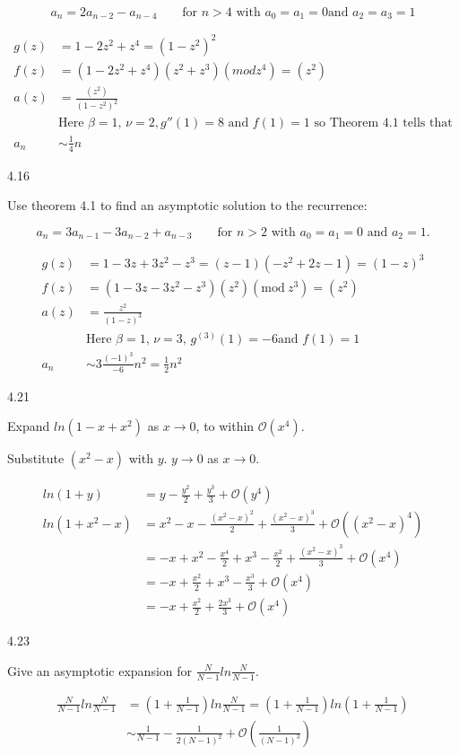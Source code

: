 \documentclass[12pt]{article}
\begin{document}
\[
a_n = 2a_{n - 2} - a_{n - 4} \qquad \text{for $n > 4$ with $a_0 = a_1 = 0$
    and $a_2 = a_3 = 1$}
\]

\[
\begin{split}
g(z) & = 1 - 2z^2 + z^4 = (1 - z^2)^2 \\
f(z) & = (1 - 2z^2 + z^4)(z^2 + z^3)(mod z^4) = (z^2) \\
a(z) & = \frac{(z^2)}{(1 - z^2)^2}\\
& \text{Here $\beta = 1$, $\nu = 2, g''(1) = 8$ and $f(1) = 1$ so Theorem 4.1 tells that} \\
a_n & \sim \frac{1}{4}n
\end{split}
\]

4.16

Use theorem 4.1 to find an asymptotic solution to the recurrence:

\[
a_n = 3a_{n - 1} - 3a_{n - 2} + a_{n - 3} \qquad
\text{for $n > 2$ with $a_0 = a_1 = 0$ and $a_2 = 1$.}
\]

\[
\begin{split}
g(z) & = 1 - 3z + 3z^2 - z^3 = (z - 1)(-z^2 + 2z - 1) = (1 - z)^3 \\
f(z) & = (1 - 3z - 3z^2 - z^3)(z^2)(\text{mod}\ z^3) = (z^2) \\
a(z) & = \frac{z^2}{(1 - z)^3} \\
& \text{Here $\beta = 1$, $\nu = 3$, $g^{(3)}(1) = -6$
    and $f(1) = 1$}\\
a_n & \sim 3\frac{(-1)^3}{-6}n^2 = \frac{1}{2}n^2
\end{split}
\]

4.21

Expand $ln(1 - x + x^2)$ as $x \rightarrow 0$, to within $\mathcal{O}(x^4)$.

Substitute $(x^2 - x)$ with $y$. $y \rightarrow 0$ as $x \rightarrow 0$.

\[
\begin{split}
ln(1 + y) & = y - \frac{y^2}{2} + \frac{y^3}{3} + \mathcal{O}(y^4) \\
ln(1 + x^2 - x) & = x^2 - x - \frac{(x^2 - x)^2}{2} + \frac{(x^2 - x)^3}{3} +
    \mathcal{O}((x^2 - x)^4) \\
    & = -x + x^2 - \frac{x^4}{2} + x^3 - \frac{x^2}{2} + \frac{(x^2 - x)^3}{3} +
    \mathcal{O}(x^4) \\
    & = -x + \frac{x^2}{2} + x^3 - \frac{x^3}{3} + \mathcal{O}(x^4) \\
    & = -x + \frac{x^2}{2} + \frac{2x^3}{3} + \mathcal{O}(x^4)
\end{split}
\]

4.23

Give an asymptotic expansion for $\frac{N}{N - 1}ln\frac{N}{N - 1}$.

\[
\begin{split}
\frac{N}{N - 1}ln\frac{N}{N - 1} & = \left(1 + \frac{1}{N - 1}\right)ln\frac{N}{N - 1}
    = \left(1 + \frac{1}{N - 1}\right)ln\left(1 + \frac{1}{N - 1}\right) \\
& \sim \frac{1}{N - 1} - \frac{1}{2(N - 1)^2} +
    \mathcal{O}\left(\frac{1}{(N - 1)^3}\right)
\end{split}
\]
\end{document}
